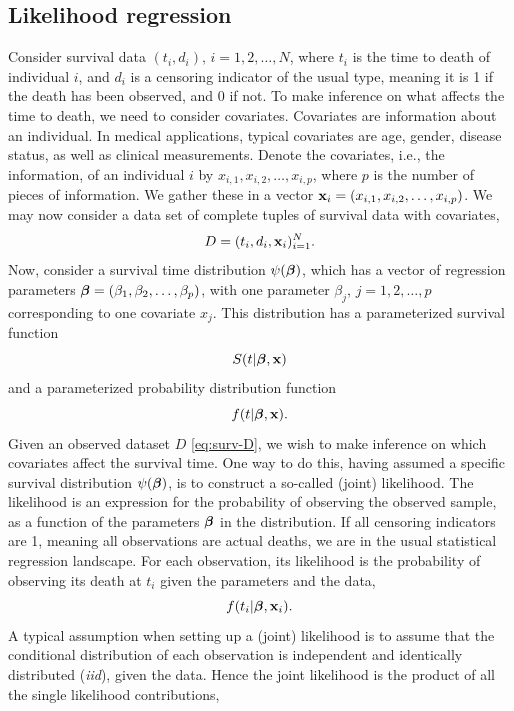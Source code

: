 \subsection{Likelihood regression}
Consider survival data $(t_i,d_i),\,i=1,2,\ldots,N$, where $t_i$ is the time to death of individual $i$, and $d_i$ is a censoring indicator of the usual type, meaning it is 1 if the death has been observed, and 0 if not.
To make inference on what affects the time to death, we need to consider covariates. Covariates are information about an individual. In medical applications, typical covariates are age, gender, disease status, as well as clinical measurements.
Denote the covariates, i.e., the information, of an individual $i$ by $x_{i,1},x_{i,2},\ldots,x_{i,p}$, where $p$ is the number of pieces of information. We gather these in a vector $\mathbf{x}_i=(x_{i,1},x_{i,2},\ldots,x_{i,p})$. We may now consider a data set of complete tuples of survival data with covariates,
\begin{equation}\label{eq:surv-D}
    D=(t_i,d_i,\mathbf{x}_i)_{i=1}^N.
\end{equation}
Now, consider a survival time distribution $\psi(\boldsymbol{\beta})$, which has a vector of regression parameters $\boldsymbol{\beta}=(\beta_1,\beta_2,\ldots,\beta_p)$, with one parameter $\beta_j,\,j=1,2,\ldots,p$ corresponding to one covariate $x_j$. This distribution has a parameterized survival function
\begin{equation*}
    S(t|\boldsymbol{\beta},\mathbf{x})
\end{equation*}
and a parameterized probability distribution function
\begin{equation*}
    f(t|\boldsymbol{\beta},\mathbf{x}).
\end{equation*}
Given an observed dataset $D$ \eqref{eq:surv-D}, we wish to make inference on which covariates affect the survival time. One way to do this, having assumed a specific survival distribution $\psi(\boldsymbol{\beta})$, is to construct a so-called (joint) likelihood.
The likelihood is an expression for the probability of observing the observed sample, as a function of the parameters $\boldsymbol{\beta}$ in the distribution. If all censoring indicators are 1, meaning all observations are actual deaths,
we are in the usual statistical regression landscape. For each observation, its likelihood is the probability of observing its death at $t_i$ given the parameters and the data,
\begin{equation*}
    f(t_i|\boldsymbol{\beta},\mathbf{x}_i).
\end{equation*}
A typical assumption when setting up a (joint) likelihood is to assume that the conditional distribution of each observation is independent and identically distributed (\textit{iid}), given the data. Hence the joint likelihood is the product of all the single likelihood contributions,
